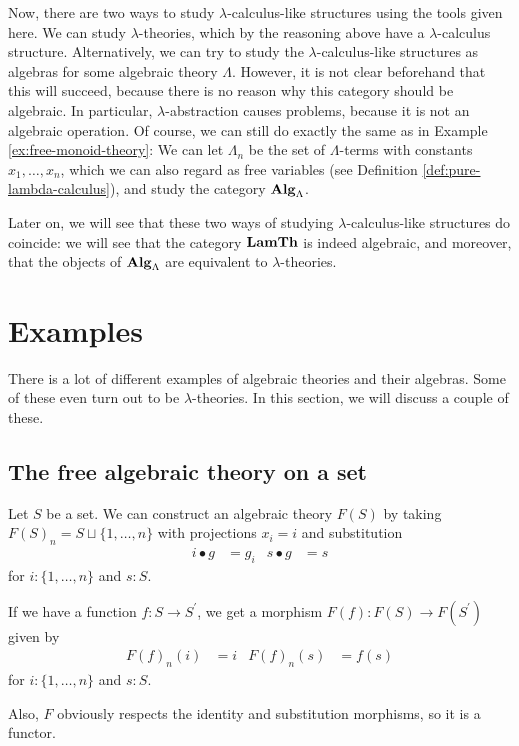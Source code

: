 \begin{remark}\label{rem:lambda-theory-or-algebra}
  Now, there are two ways to study $ \lambda $-calculus-like structures using the tools given here. We can study $ \lambda $-theories, which by the reasoning above have a $ \lambda $-calculus structure. Alternatively, we can try to study the $ \lambda $-calculus-like structures as algebras for some algebraic theory $ \Lambda $. However, it is not clear beforehand that this will succeed, because there is no reason why this category should be algebraic. In particular, $ \lambda $-abstraction causes problems, because it is not an algebraic operation. Of course, we can still do exactly the same as in Example \ref{ex:free-monoid-theory}: We can let $ \Lambda_n $ be the set of $ \Lambda $-terms with constants $ x_1, \dots, x_n $, which we can also regard as free variables (see Definition \ref{def:pure-lambda-calculus}), and study the category $ \mathbf{Alg}_{\Lambda} $.

  Later on, we will see that these two ways of studying $ \lambda $-calculus-like structures do coincide: we will see that the category $ \mathbf{LamTh} $ is indeed algebraic, and moreover, that the objects of $ \mathbf{Alg}_{\Lambda} $ are equivalent to $ \lambda $-theories.
\end{remark}

\section{Examples}

There is a lot of different examples of algebraic theories and their algebras. Some of these even turn out to be $ \lambda $-theories. In this section, we will discuss a couple of these.

\subsection{The free algebraic theory on a set}
\begin{example}
  Let $ S $ be a set. We can construct an algebraic theory $ F(S) $ by taking $ F(S)_n = S \sqcup \{ 1, \dots, n \} $ with projections $ x_i = i $ and substitution
  \begin{align*}
    i \bullet g &= g_i & s \bullet g &= s
  \end{align*}
  for $ i : \{ 1, \dots, n \} $ and $ s : S $.

  If we have a function $ f: S \to S^\prime $, we get a morphism $ F(f): F(S) \to F(S^\prime) $ given by
  \begin{align*}
    F(f)_n(i) &= i & F(f)_n(s) &= f(s)
  \end{align*}
  for $ i : \{ 1, \dots, n \} $ and $ s : S $.

  Also, $ F $ obviously respects the identity and substitution morphisms, so it is a functor.
\end{example}

